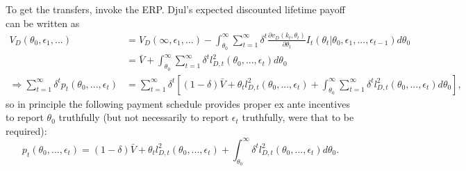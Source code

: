 \documentclass[a4paper]{article}
\begin{document}
\begin{enumerate}
		To get the transfers, invoke the ERP. Djul's expected discounted lifetime payoff can be written as
		\begin{align*}
			V_D(\theta_0,\epsilon_1,...) &= V_D(\infty,\epsilon_1,...) - \int_{\theta_0}^{\infty} \sum_{t=1}^\infty \delta^t \frac{\partial v_D (k_t,\theta_t)}{\partial \theta_t} I_t(\theta_t | \theta_0,\epsilon_1,...,\epsilon_{t-1}) d \theta_0 
			\\
			&= \bar{V} + \int_{\theta_0}^{\infty} \sum_{t=1}^\infty \delta^t l_{D,t}^2 (\theta_0,...,\epsilon_t) d \theta_0 
			\\
			\Rightarrow
			\sum_{t=1}^\infty \delta^t p_t(\theta_0,...,\epsilon_t) &= \sum_{t=1}^\infty \delta^t \left[ (1-\delta)\bar{V} + \theta_t l_{D,t}^2(\theta_0,...,\epsilon_t) + \int_{\theta_0}^{\infty} \sum_{t=1}^\infty \delta^t l_{D,t}^2 (\theta_0,...,\epsilon_t) d \theta_0 \right],
		\end{align*}
		so in principle the following payment schedule provides proper ex ante incentives to report $\theta_0$ truthfully (but not necessarily to report $\epsilon_t$ truthfully, were that to be required):
		$$p_t(\theta_0,...,\epsilon_t) = (1-\delta)\bar{V} + \theta_t l_{D,t}^2(\theta_0,...,\epsilon_t) + \int_{\theta_0}^{\infty} \delta^t l_{D,t}^2 (\theta_0,...,\epsilon_t) d \theta_0.$$
	\end{enumerate}
	\fi
	
	
	
	
\end{document}
